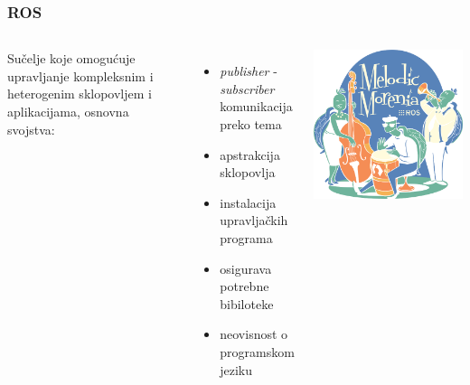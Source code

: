 \documentclass{beamer}
\begin{document}
\begin{frame}
    \frametitle{ROS}
    \begin{columns}
        Sučelje koje omogućuje upravljanje kompleksnim i heterogenim sklopovljem i aplikacijama, osnovna svojstva:\newline
        \begin{itemize} 
            \item \emph{publisher} - \emph{subscriber} komunikacija preko tema
            \item apstrakcija sklopovlja
            \item instalacija upravljačkih programa
            \item osigurava potrebne bibiloteke
            \item neovisnost o programskom jeziku
        \end{itemize}
        \includegraphics{ros.png}
    \end{columns}
\end{frame}
\end{document}
